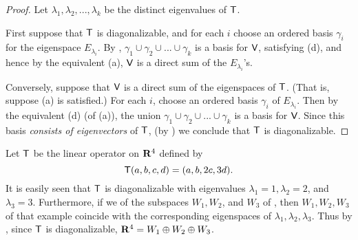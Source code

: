\begin{proof}
Let \(\lambda_1, \lambda_2, ..., \lambda_k\) be the distinct eigenvalues of \(\textsf{T}\).

First suppose that \(\textsf{T}\) is diagonalizable, and for each \(i\) choose an ordered basis \(\gamma_i\) for the eigenspace \(E_{\lambda_i}\).
By , \(\gamma_1 \cup \gamma_2 \cup ... \cup \gamma_k\) is a basis for \(\textsf{V}\), satisfying (d), and hence by the equivalent (a), \(\textsf{V}\) is a direct sum of the \(E_{\lambda_i}\)'s.

Conversely, suppose that \(\textsf{V}\) is a direct sum of the eigenspaces of \(\textsf{T}\).
(That is, suppose (a) is satisfied.)
For each \(i\), choose an ordered basis \(\gamma_i\) of \(E_{\lambda_i}\).
Then by the equivalent (d) (of (a)), the union \(\gamma_1 \cup \gamma_2 \cup ... \cup \gamma_k\) is a basis for \(\textsf{V}\).
Since this basis \emph{consists of eigenvectors} of \(\textsf{T}\), (by ) we conclude that \(\textsf{T}\) is diagonalizable.
\end{proof}

\begin{example} \label{example 5.2.10}
Let \(\textsf{T}\) be the linear operator on \(\mathbf{R}^4\) defined by
\[
    \textsf{T}(a, b, c, d) = (a, b, 2c, 3d).
\]
It is easily seen that \(\textsf{T}\) is diagonalizable with eigenvalues \(\lambda_1 = 1, \lambda_2 = 2\), and \(\lambda_3 = 3\).
Furthermore, if we  of the subspaces \(W_1, W_2\), and \(W_3\) of , then \(W_1, W_2, W_3\) of that example coincide with the corresponding eigenspaces of \(\lambda_1, \lambda_2, \lambda_3\).
Thus by , since \(\textsf{T}\) is diagonalizable, \(\mathbf{R}^4 = W_1 \oplus W_2 \oplus W_3\).
\end{example}
